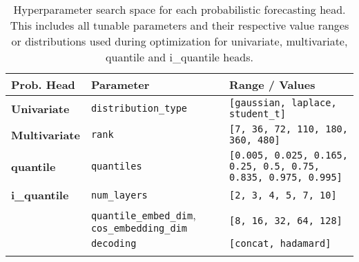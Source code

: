 \documentclass[a4paper,oneside,bibliography=totoc]{scrbook}
\begin{document}
\clearpage
\begin{table}[htbp]
\caption{Hyperparameter search space for each probabilistic forecasting head. This includes all tunable parameters and their respective value ranges or distributions used during optimization for univariate, multivariate, quantile and i\_quantile heads.}
\centering
\setlength{\tabcolsep}{3pt}
\renewcommand{\arraystretch}{1.2}
\begin{adjustbox}{center}
\begin{tabular}{lp{5cm}p{8cm}}
\toprule
\textbf{Prob. Head} & \textbf{Parameter} & \textbf{Range / Values} \\
\midrule
\textbf{Univariate}
&\texttt{distribution\_type} & \texttt{[gaussian, laplace, student\_t]} \\
\hline
\textbf{Multivariate}
&\texttt{rank} & \texttt{[7, 36, 72, 110, 180, 360, 480]} \\
\hline
\textbf{quantile}
&\texttt{quantiles} & \texttt{[0.005, 0.025, 0.165, 0.25, 0.5, 0.75, 0.835, 0.975, 0.995]} \\
\hline
\textbf{i\_quantile}
&\texttt{num\_layers} & \texttt{[2, 3, 4, 5, 7, 10]} \\
&\texttt{quantile\_embed\_dim}, \texttt{cos\_embedding\_dim} & \texttt{[8, 16, 32, 64, 128]} \\
&\texttt{decoding} & \texttt{[concat, hadamard]} \\
\bottomrule
\label{tab:distribution_hp}
\end{tabular}
\end{adjustbox}
\end{table}
\end{document}
